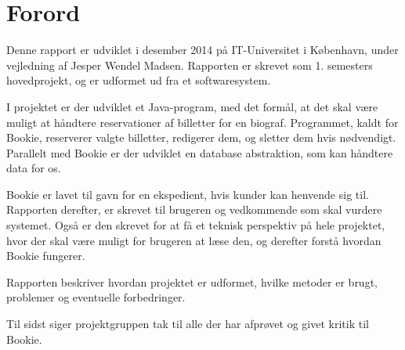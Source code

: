 \chapter{Forord}


Denne rapport er udviklet i desember 2014 på IT-Universitet i København,  under vejledning af Jesper Wendel Madsen. Rapporten er skrevet som 1. semesters hovedprojekt, og er udformet ud fra et softwaresystem.

I projektet er der udviklet et Java-program, med det formål, at det skal være muligt at håndtere reservationer af billetter for en biograf. Programmet, kaldt for Bookie, reserverer valgte billetter, redigerer dem, og sletter dem hvis nødvendigt. Parallelt med Bookie er der udviklet en database abstraktion, som kan håndtere data for os.

Bookie er lavet til gavn for en ekspedient, hvis kunder kan henvende sig til. Rapporten derefter, er skrevet til brugeren og vedkommende som skal vurdere systemet. Også er den skrevet for at få et teknisk perspektiv på hele projektet, hvor der skal være muligt for brugeren at læse den, og derefter forstå hvordan Bookie fungerer.

Rapporten beskriver hvordan projektet er udformet, hvilke metoder er brugt, problemer og eventuelle forbedringer.

Til sidst siger projektgruppen tak til alle der har afprøvet og givet kritik til Bookie.





